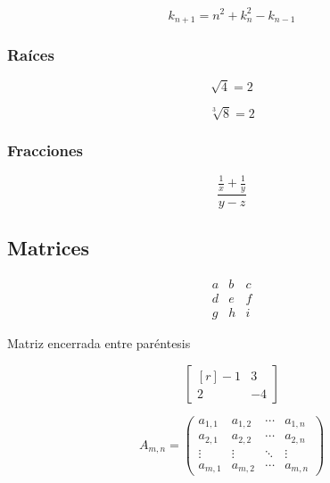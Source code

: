 \documentclass{article}
\begin{document}
\begin{equation*}
  k_{n+1} = n^2 + k_n^2 - k_{n-1}
\end{equation*}

\subsubsection{Raíces}

\begin{equation*}
  \sqrt{4} = 2
\end{equation*}

\begin{equation*}
  \sqrt[3]{8} = 2
\end{equation*}

\subsubsection{Fracciones}

\begin{equation*}
  \frac{\frac{1}{x}+\frac{1}{y}}{y-z}
\end{equation*}

\subsection{Matrices}

\begin{equation*}
  \begin{matrix}
    a & b & c \\
    d & e & f \\
    g & h & i
  \end{matrix}
\end{equation*}

Matriz encerrada entre paréntesis

\begin{equation*}
  \begin{bmatrix*}[r]
    -1 & 3  \\
    2  & -4
  \end{bmatrix*}
\end{equation*}

\begin{equation*}
  A_{m,n} = 
    \begin{pmatrix}
      a_{1,1} & a_{1,2} & \cdots & a_{1,n} \\
      a_{2,1} & a_{2,2} & \cdots & a_{2,n} \\
      \vdots  & \vdots  & \ddots & \vdots  \\
      a_{m,1} & a_{m,2} & \cdots & a_{m,n}
    \end{pmatrix}
\end{equation*}
\end{document}
